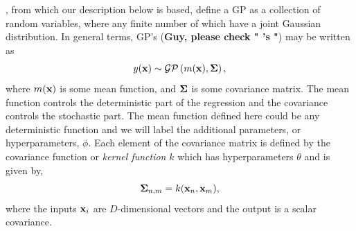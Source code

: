 \citet{williams1996gaussian}, from which our description below is based, define a GP as a collection of random variables, where any finite number of which have a joint Gaussian distribution.  In general terms, GP's ({\bf Guy, please check " 's "}) may be written as
\begin{equation}
y({\bf x}) \sim \mathcal{GP}\left( m({\bf x}), {\bf \Sigma}\right),
\end{equation}
where $m({\bf x})$ is some mean function, and ${\bf \Sigma}$ is some covariance matrix.  The mean function controls the deterministic part of the regression and the covariance controls the stochastic part.  The mean function defined here could be any deterministic function and we will label the additional parameters, or hyperparameters, $\phi$.  Each element of the covariance matrix is defined by the covariance function or {\it kernel function} $k$ which has hyperparameters $\theta$ and is given by,
\begin{equation}
{\bf \Sigma}_{n, m} = k({\bf x}_{n}, {\bf x}_{m}),
\end{equation}
where the inputs ${\bf x}_{i}$ are $D$-dimensional vectors and the output is a scalar covariance.

